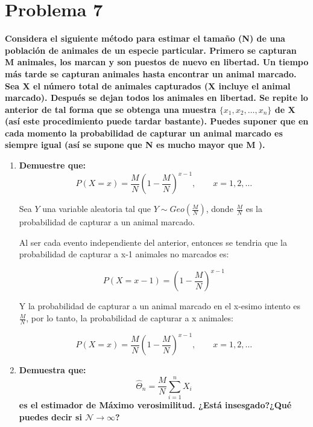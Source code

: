 \section*{Problema 7}

\textbf{Considera el siguiente método para estimar el tamaño (N) de una población de animales de un especie particular. Primero se capturan M animales, los marcan y son puestos de nuevo en libertad. Un tiempo más tarde se capturan animales hasta encontrar un animal marcado. Sea X el número total de animales capturados (X incluye el animal marcado). Después se dejan todos los animales en libertad. Se repite lo anterior de tal forma que se obtenga una muestra $\{x_1,x_2,\dots,x_n\}$ de X (así este procedimiento puede tardar bastante). Puedes suponer que en cada momento la probabilidad de capturar un animal marcado es siempre igual (así se supone que N es mucho mayor que M ).
}

\begin{enumerate}
    \item \textbf{Demuestre que:}
          \begin{equation*}
              P(X=x) = \frac{M}{N} \left (1-\frac{M}{N}\right )^{x-1}, \qquad x=1,2,\dots
          \end{equation*}

          Sea $Y$ una variable aleatoria tal que $Y\sim Geo\left (\frac{M}{N}\right )$, donde $\frac{M}{N}$ es la probabilidad de capturar a un animal marcado.

          Al ser cada evento independiente del anterior, entonces se tendria que la probabilidad de capturar a x-1 animales no marcados es:

          \begin{equation}
              P(X=x-1) = \left (1-\frac{M}{N}\right )^{x-1}
          \end{equation}

          Y la probabilidad de capturar a un animal marcado en el x-esimo intento es $\frac{M}{N}$, por lo tanto, la probabilidad de capturar a x animales:

          \begin{equation*}
              P(X=x) = \frac{M}{N} \left (1-\frac{M}{N}\right )^{x-1}, \qquad x=1,2,\dots
          \end{equation*}

    \item \textbf{Demuestra que:}
          \begin{equation*}
              \hat{\Theta}_n = \frac{M}{N} \sum_{i=1}^n X_i
          \end{equation*}
          \textbf{es el estimador de Máximo verosimilitud. ¿Está insesgado?¿Qué puedes decir si $\mathcal{N}\rightarrow \infty$?}
\end{enumerate}